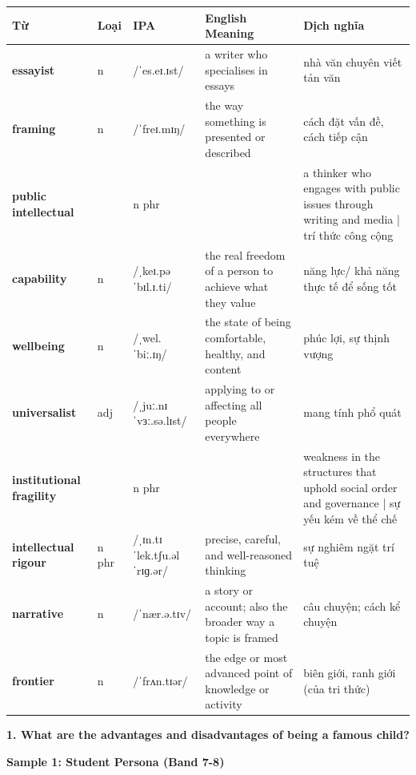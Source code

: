 \vspace{0.8em}
\begin{center}
\renewcommand{\arraystretch}{1.65}
\begin{tabularx}{\textwidth}{|V{0.22\textwidth}|C{0.07\textwidth}|I{0.20\textwidth}|Y|V{0.18\textwidth}|}
\hline
{}
\textbf{Từ} & \textbf{Loại} & \textbf{IPA} & \textbf{English Meaning} & \textbf{Dịch nghĩa} \\
\hline
\textbf{essayist} & n & /ˈes.eɪ.ɪst/ & a writer who specialises in essays & nhà văn chuyên viết tản văn \\ \hline
\textbf{framing} & n & /ˈfreɪ.mɪŋ/ & the way something is presented or described & cách đặt vấn đề, cách tiếp cận \\ \hline
\textbf{public intellectual} & & n phr & & a thinker who engages with public issues through writing and media | trí thức công cộng \\ \hline
\textbf{capability} & n & /ˌkeɪ.pəˈbɪl.ɪ.ti/ & the real freedom of a person to achieve what they value & năng lực/ khả năng thực tế để sống tốt \\ \hline
\textbf{wellbeing} & n & /ˌwel.ˈbiː.ɪŋ/ & the state of being comfortable, healthy, and content & phúc lợi, sự thịnh vượng \\ \hline
\textbf{universalist} & adj & /ˌjuː.nɪˈvɜː.sə.lɪst/ & applying to or affecting all people everywhere & mang tính phổ quát \\ \hline
\textbf{institutional fragility} & & n phr & & weakness in the structures that uphold social order and governance | sự yếu kém về thể chế \\ \hline
\textbf{intellectual rigour} & n phr & /ˌɪn.tɪˈlek.tʃu.əl ˈrɪɡ.ər/ & precise, careful, and well-reasoned thinking & sự nghiêm ngặt trí tuệ \\ \hline
\textbf{narrative} & n & /ˈnær.ə.tɪv/ & a story or account; also the broader way a topic is framed & câu chuyện; cách kể chuyện \\ \hline
\textbf{frontier} & n & /ˈfrʌn.tɪər/ & the edge or most advanced point of knowledge or activity & biên giới, ranh giới (của tri thức) \\ \hline
\end{tabularx}
\end{center}

\partthreeheader

\begin{ieltsquestion}
\textbf{1. What are the advantages and disadvantages of being a famous child?}
\end{ieltsquestion}
\textbf{Sample 1: Student Persona (Band 7-8)}

